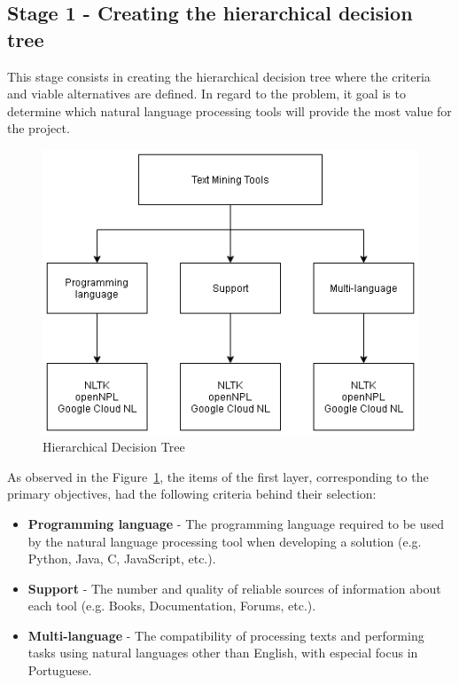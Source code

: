 \subsection{Stage 1 - Creating the hierarchical decision tree}

This stage consists in creating the hierarchical decision tree where the criteria and viable alternatives are defined.
In regard to the problem, it goal is to determine which natural language processing tools will provide the most value for the project.

\begin{figure}[H]
\centering
\includegraphics[scale=0.5]{ch3/assets/AHP.png}
\caption[Hierarchical Decision Tree]{Hierarchical Decision Tree}
\label{fig:AHP}
\end{figure}

As observed in the Figure~\ref{fig:AHP}, the items of the first layer, corresponding to the primary objectives, had the following criteria behind their selection:
\begin{itemize}
    \item \textbf{Programming language} - The programming language required to be used by the natural language processing tool when developing a solution (e.g. Python, Java, C, JavaScript, etc.).
    \item \textbf{Support} - The number and quality of reliable sources of information about each tool (e.g. Books, Documentation, Forums, etc.).
    \item \textbf{Multi-language} - The compatibility of processing texts and performing tasks using natural languages other than English, with especial focus in Portuguese.
\end{itemize}

